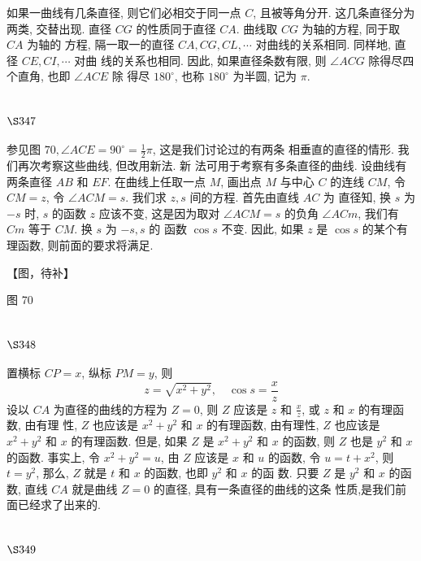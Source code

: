 如果一曲线有几条直径, 则它们必相交于同一点 $C$, 且被等角分开. 这几条直径分为 两类, 交替出现. 直径 $C G$ 的性质同于直径 $C A$. 曲线取 $C G$ 为轴的方程, 同于取 $C A$ 为轴的 方程, 隔一取一的直径 $C A, C G, C L, \cdots$ 对曲线的关系相同. 同样地, 直径 $C E, C I, \cdots$ 对曲 线的关系也相同. 因此, 如果直径条数有限, 则 $\angle A C G$ 除得尽四个直角, 也即 $\angle A C E$ 除 得尽 $180^{\circ}$, 也称 $180^{\circ}$ 为半圆, 记为 $\pi$. 

\section{$\S 347$}

参见图 $70, \angle A C E=90^{\circ}=\frac{1}{2} \pi$, 这是我们讨论过的有两条 相垂直的直径的情形. 我们再次考察这些曲线, 但改用新法. 新 法可用于考察有多条直径的曲线. 设曲线有两条直径 $A B$ 和 $E F$. 在曲线上任取一点 $M$, 画出点 $M$ 与中心 $C$ 的连线 $C M$, 令 $C M=z$, 令 $\angle A C M=s$. 我们求 $z, s$ 间的方程. 首先由直线 $A C$ 为 直径知, 换 $s$ 为 $-s$ 时, $s$ 的函数 $z$ 应该不变, 这是因为取对 $\angle A C M=s$ 的负角 $\angle A C m$, 我们有 $C m$ 等于 $C M$. 换 $s$ 为 $-s, s$ 的 函数 $\cos s$ 不变. 因此, 如果 $z$ 是 $\cos s$ 的某个有理函数, 则前面的要求将满足.


【图，待补】

图 70 

\section{$\S 348$}
置横标 $C P=x$, 纵标 $P M=y$, 则
\[
z=\sqrt{x^{2}+y^{2}}, \quad \cos s=\frac{x}{z}
\]
设以 $C A$ 为直径的曲线的方程为 $Z=0$, 则 $Z$ 应该是 $z$ 和 $\frac{x}{z}$, 或 $z$ 和 $x$ 的有理函数, 由有理 性, $Z$ 也应该是 $x^{2}+y^{2}$ 和 $x$ 的有理函数, 由有理性, $Z$ 也应该是 $x^{2}+y^{2}$ 和 $x$ 的有理函数. 但是, 如果 $Z$ 是 $x^{2}+y^{2}$ 和 $x$ 的函数, 则 $Z$ 也是 $y^{2}$ 和 $x$ 的函数. 事实上, 令 $x^{2}+y^{2}=u$, 由 $Z$ 应该是 $x$ 和 $u$ 的函数, 令 $u=t+x^{2}$, 则 $t=y^{2}$, 那么, $Z$ 就是 $t$ 和 $x$ 的函数, 也即 $y^{2}$ 和 $x$ 的函 数. 只要 $Z$ 是 $y^{2}$ 和 $x$ 的函数, 直线 $C A$ 就是曲线 $Z=0$ 的直径, 具有一条直径的曲线的这条 性质,是我们前面已经求了出来的.

\section{$\S 349$}

